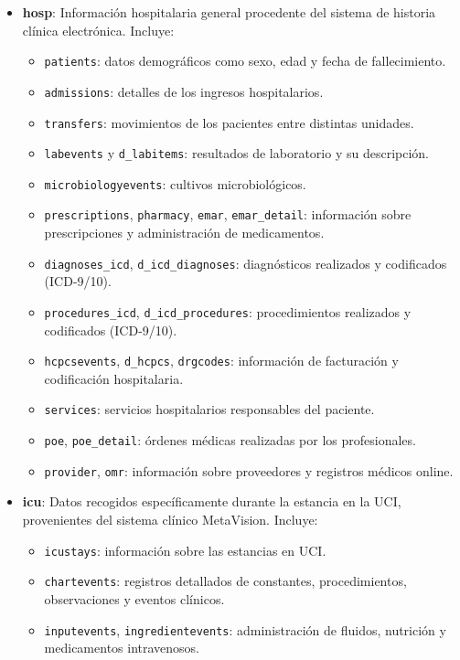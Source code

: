 \begin{itemize}
    \item \textbf{hosp}: Información hospitalaria general procedente del sistema de historia clínica electrónica. Incluye:
    \begin{itemize}
        \item \texttt{patients}: datos demográficos como sexo, edad y fecha de fallecimiento.
        \item \texttt{admissions}: detalles de los ingresos hospitalarios.
        \item \texttt{transfers}: movimientos de los pacientes entre distintas unidades.
        \item \texttt{labevents} y \texttt{d\_labitems}: resultados de laboratorio y su descripción.
        \item \texttt{microbiologyevents}: cultivos microbiológicos.
        \item \texttt{prescriptions}, \texttt{pharmacy}, \texttt{emar}, \texttt{emar\_detail}: información sobre prescripciones y administración de medicamentos.
        \item \texttt{diagnoses\_icd}, \texttt{d\_icd\_diagnoses}: diagnósticos realizados y codificados (ICD-9/10).
        \item \texttt{procedures\_icd}, \texttt{d\_icd\_procedures}: procedimientos realizados y codificados (ICD-9/10).
        \item \texttt{hcpcsevents}, \texttt{d\_hcpcs}, \texttt{drgcodes}: información de facturación y codificación hospitalaria.
        \item \texttt{services}: servicios hospitalarios responsables del paciente.
        \item \texttt{poe}, \texttt{poe\_detail}: órdenes médicas realizadas por los profesionales.
        \item \texttt{provider}, \texttt{omr}: información sobre proveedores y registros médicos online.
    \end{itemize}
    \item \textbf{icu}: Datos recogidos específicamente durante la estancia en la UCI, provenientes del sistema clínico MetaVision. Incluye:
    \begin{itemize}
        \item \texttt{icustays}: información sobre las estancias en UCI.
        \item \texttt{chartevents}: registros detallados de constantes, procedimientos, observaciones y eventos clínicos.
        \item \texttt{inputevents}, \texttt{ingredientevents}: administración de fluidos, nutrición y medicamentos intravenosos.

\end{itemize}
\end{itemize}
